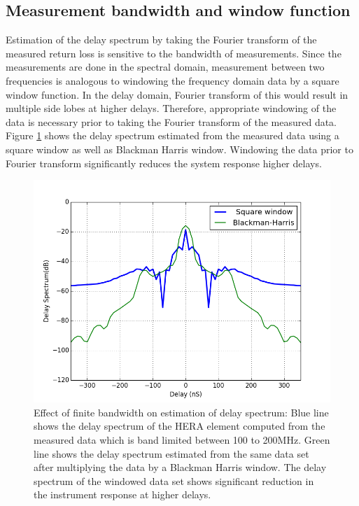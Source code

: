 \documentclass[twocolumn]{emulateapj}
\begin{document}
\subsection{\textbf{Measurement bandwidth and window function}}
Estimation of the delay spectrum by taking the Fourier transform of the measured return loss is sensitive to the bandwidth of measurements. Since the measurements are done in the spectral domain, measurement between two frequencies is analogous to windowing the frequency domain data by a square window function. In the delay domain, Fourier transform of this would result in multiple side lobes at higher delays. Therefore, appropriate windowing of the data is  necessary prior to taking the Fourier transform of the measured data. Figure \ref{fig:window} shows the delay spectrum estimated from the measured data using a square window as well as Blackman Harris window. Windowing the data prior to Fourier transform significantly reduces the system response higher delays.  
\begin{figure}
\centering
\includegraphics[width=\linewidth]{plots/window_effect.png}
\caption{Effect of finite bandwidth on estimation of delay spectrum: Blue line shows the delay spectrum of the HERA element computed from the measured data which is band limited between 100 to 200MHz. Green line shows the delay spectrum estimated from the same data set after multiplying the data by a Blackman Harris window. The delay spectrum of the windowed data set shows significant reduction in the instrument response at higher delays.}
\label{fig:window}
\end{figure} 
\end{document}
